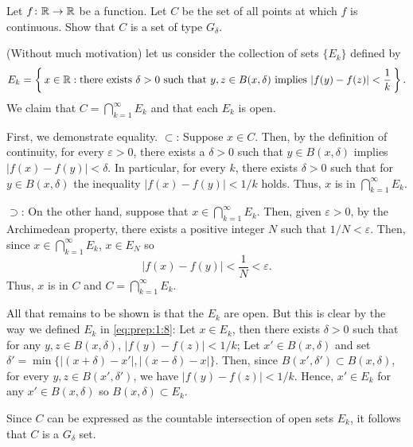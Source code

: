 \begin{problem}
  Let $f\colon\mathbb{R}\to\mathbb{R}$ be a function. Let $C$ be the set of all points
  at which $f$ is continuous. Show that $C$ is a set of type $G_\delta$.
\end{problem}
\begin{solution}
  (Without much motivation) let us consider the collection of sets
  $\{E_k\}$ defined by
  \begin{equation}
    \label{eq:prep:1:8}
    E_k=\left\{\,x\in\mathbb{R}:
      \text{there exists $\delta>0$ such that $y,z\in B(x,\delta)$ implies $\left|f(y)-f(z)\right|<\frac{1}{k}$}\,\right\}.
  \end{equation}
  We claim that $C=\bigcap_{k=1}^\infty E_k$ and that each $E_k$ is open.
  \begin{solution}
    First, we demonstrate equality. $\subset$: Suppose $x\in C$. Then, by
    the definition of continuity, for every $\varepsilon>0$, there exists a
    $\delta>0$ such that $y\in B(x,\delta)$ implies
    $|f(x)-f(y)|<\delta$. In particular, for every $k$, there exists
    $\delta>0$ such that for $y\in B(x,\delta)$ the inequality
    $|f(x)-f(y)|<1/k$ holds. Thus, $x$ is in $\bigcap_{k=1}^\infty E_k$.

    $\supset$: On the other hand, suppose that
    $x\in\bigcap_{k=1}^\infty E_k$. Then, given $\varepsilon>0$, by the
    Archimedean property, there exists a positive integer $N$ such that
    $1/N<\varepsilon$. Then, since $x\in\bigcap_{k=1}^\infty E_k$,
    $x\in E_N$ so
    \begin{equation}
      \label{eq:prep:1:9}
      |f(x)-f(y)|<\frac{1}{N}<\varepsilon.
    \end{equation}
    Thus, $x$ is in $C$ and $C=\bigcap_{k=1}^\infty E_k$.

    All that remains to be shown is that the $E_k$ are open. But this is
    clear by the way we defined $E_k$ in \eqref{eq:prep:1:8}: Let
    $x\in E_k$, then there exists $\delta>0$ such that for any
    $y,z\in B(x,\delta)$, $|f(y)-f(z)|<1/k$; Let $x'\in B(x,\delta)$ and
    set $\delta'=\min\{|(x+\delta)-x'|,|(x-\delta)-x|\}$. Then, since
    $B(x',\delta')\subset B(x,\delta)$, for every $y,z\in B(x',\delta')$,
    we have $|f(y)-f(z)|<1/k$. Hence, $x'\in E_k$ for any
    $x'\in B(x,\delta)$ so $B(x,\delta)\subset E_k$.
  \end{solution}
  Since $C$ can be expressed as the countable intersection of open sets
  $E_k$, it follows that $C$ is a $G_\delta$ set.
\end{solution}
